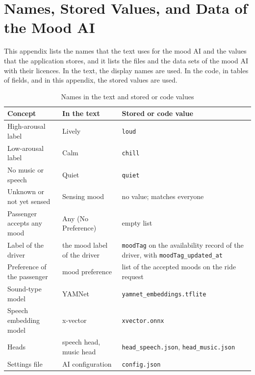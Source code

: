 \chapter{Names, Stored Values, and Data of the Mood AI}
\label{app:clips}
\clearpage

This appendix lists the names that the text uses for the mood AI and the values that the application stores, and it lists the files and the data sets of the mood AI with their licences. In the text, the display names are used. In the code, in tables of fields, and in this appendix, the stored values are used.

\begin{table}[htbp]
    \centering
    \caption{Names in the text and stored or code values}\label{tab:ai-names}
    \small
    \renewcommand{\arraystretch}{1.2}
    \begin{tabular}{|>{\raggedright\arraybackslash}p{}|>{\raggedright\arraybackslash}p{}|>{\raggedright\arraybackslash}p{}|}
        \hline
        \textbf{Concept} & \textbf{In the text} & \textbf{Stored or code value} \\
        \hline
        High-arousal label & Lively & \texttt{loud} \\
        \hline
        Low-arousal label & Calm & \texttt{chill} \\
        \hline
        No music or speech & Quiet & \texttt{quiet} \\
        \hline
        Unknown or not yet sensed & Sensing mood & no value; matches everyone \\
        \hline
        Passenger accepts any mood & Any (No Preference) & empty list \\
        \hline
        Label of the driver & the mood label of the driver & \texttt{moodTag} on the availability record of the driver, with \texttt{moodTag\_updated\_at} \\
        \hline
        Preference of the passenger & mood preference & list of the accepted moods on the ride request \\
        \hline
        Sound-type model & YAMNet & \texttt{yamnet\_embeddings.tflite} \\
        \hline
        Speech embedding model & x-vector & \texttt{xvector.onnx} \\
        \hline
        Heads & speech head, music head & \texttt{head\_speech.json}, \texttt{head\_music.json} \\
        \hline
        Settings file & AI configuration & \texttt{config.json} \\
        \hline
    \end{tabular}
\end{table}

